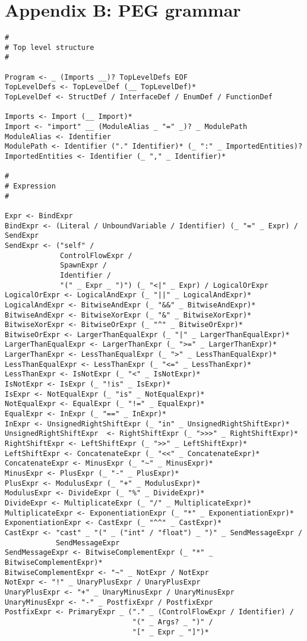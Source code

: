 \hypertarget{appendix-b-peg-grammar}{%
\section{Appendix B: PEG grammar}\label{appendix-b-peg-grammar}}

\begin{verbatim}
#
# Top level structure
#

Program <- _ (Imports __)? TopLevelDefs EOF
TopLevelDefs <- TopLevelDef (__ TopLevelDef)*
TopLevelDef <- StructDef / InterfaceDef / EnumDef / FunctionDef

Imports <- Import (__ Import)*
Import <- "import" __ (ModuleAlias _ "=" _)? _ ModulePath
ModuleAlias <- Identifier
ModulePath <- Identifier ("." Identifier)* (_ ":" _ ImportedEntities)?
ImportedEntities <- Identifier (_ "," _ Identifier)*

#
# Expression
#

Expr <- BindExpr
BindExpr <- (Literal / UnboundVariable / Identifier) (_ "=" _ Expr) / SendExpr
SendExpr <- ("self" /
             ControlFlowExpr /
             SpawnExpr /
             Identifier /
             "(" _ Expr _ ")") (_ "<|" _ Expr) / LogicalOrExpr
LogicalOrExpr <- LogicalAndExpr (_ "||" _ LogicalAndExpr)*
LogicalAndExpr <- BitwiseAndExpr (_ "&&" _ BitwiseAndExpr)*
BitwiseAndExpr <- BitwiseXorExpr (_ "&" _ BitwiseXorExpr)*
BitwiseXorExpr <- BitwiseOrExpr (_ "^" _ BitwiseOrExpr)*
BitwiseOrExpr <- LargerThanEqualExpr (_ "|" _ LargerThanEqualExpr)*
LargerThanEqualExpr <- LargerThanExpr (_ ">=" _ LargerThanExpr)*
LargerThanExpr <- LessThanEqualExpr (_ ">" _ LessThanEqualExpr)*
LessThanEqualExpr <- LessThanExpr (_ "<=" _ LessThanExpr)*
LessThanExpr <- IsNotExpr (_ "<" _ IsNotExpr)*
IsNotExpr <- IsExpr (_ "!is" _ IsExpr)*
IsExpr <- NotEqualExpr (_ "is" _ NotEqualExpr)*
NotEqualExpr <- EqualExpr (_ "!=" _ EqualExpr)*
EqualExpr <- InExpr (_ "==" _ InExpr)*
InExpr <- UnsignedRightShiftExpr (_ "in" _ UnsignedRightShiftExpr)*
UnsignedRightShiftExpr  <- RightShiftExpr (_ ">>>" _ RightShiftExpr)*
RightShiftExpr <- LeftShiftExpr (_ ">>" _ LeftShiftExpr)*
LeftShiftExpr <- ConcatenateExpr (_ "<<" _ ConcatenateExpr)*
ConcatenateExpr <- MinusExpr (_ "~" _ MinusExpr)*
MinusExpr <- PlusExpr (_ "-" _ PlusExpr)*
PlusExpr <- ModulusExpr (_ "+" _ ModulusExpr)*
ModulusExpr <- DivideExpr (_ "%" _ DivideExpr)*
DivideExpr <- MultiplicateExpr (_ "/" _ MultiplicateExpr)*
MultiplicateExpr <- ExponentiationExpr (_ "*" _ ExponentiationExpr)*
ExponentiationExpr <- CastExpr (_ "^^" _ CastExpr)*
CastExpr <- "cast" _ "(" _ ("int" / "float") _ ")" _ SendMessageExpr /
            SendMessageExpr
SendMessageExpr <- BitwiseComplementExpr (_ "*" _ BitwiseComplementExpr)*
BitwiseComplementExpr <- "~" _ NotExpr / NotExpr
NotExpr <- "!" _ UnaryPlusExpr / UnaryPlusExpr
UnaryPlusExpr <- "+" _ UnaryMinusExpr / UnaryMinusExpr
UnaryMinusExpr <- "-" _ PostfixExpr / PostfixExpr
PostfixExpr <- PrimaryExpr _ ("." _ (ControlFlowExpr / Identifier) /
                              "(" _ Args? _ ")" /
                              "[" _ Expr _ "]")*


\end{verbatim}
